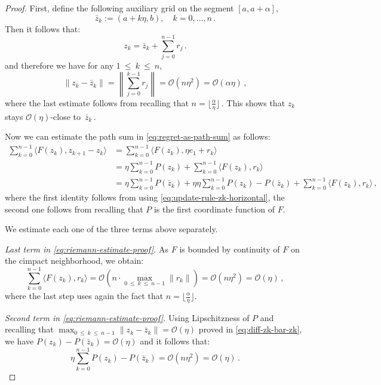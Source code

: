 \documentclass[a4paper,11pt,fullpage]{article}
\theoremstyle{plain}
\theoremstyle{definition}
\theoremstyle{plain}
\renewcommand{\leq}{~\le~}
\begin{document}
\begin{proof}
First, define the following auxiliary grid on the segment $[a, a+\alpha]$, 
\begin{equation*}
\bar{z}_k := (a + k \eta, b), \quad k= 0, \dots, n\,.
\end{equation*}
Then it follows that: 
\begin{equation*}
z_k = \bar{z}_k + \sum_{j=0}^{n-1} r_j\,.
\end{equation*}
and therefore we have for any $1 \leq k \leq n$, 
\begin{equation}
\label{eq:diff-zk-bar-zk}
\|z_k - \bar{z}_k \| = \left\| \sum_{j=0}^{k-1} r_j \right\| = \mathcal{O}(n \eta^2) = \mathcal{O}(\alpha \eta)\,,  
\end{equation}
where the last estimate follows from recalling that $n = \lfloor \frac{\alpha}{\eta}\rfloor\,.$ 
This shows that $z_k$ stays $\mathcal{O}(\eta)$-close to~$\bar{z}_k\,.$ 

Now we can estimate the path sum in \eqref{eq:regret-as-path-sum} as follows: 
\begin{align}
\label{eq:riemann-estimate-proof}
\sum_{k=0}^{n-1} \langle F(z_k), z_{k+1} - z_k \rangle 
&= \sum_{k=0}^{n-1} \langle F(z_k), \eta e_1 + r_k \rangle \nonumber\\
&= \eta \sum_{k=0}^{n-1} P(z_k) + \sum_{k=0}^{n-1} \langle F(z_k), r_k\rangle \nonumber\\
&= \eta \sum_{k=0}^{n-1} P(\bar{z}_k) + \eta \eta \sum_{k=0}^{n-1} P(z_k) - P(\bar{z}_k) + \sum_{k=0}^{n-1} \langle F(z_k), r_k\rangle\,,
\end{align}
where the first identity follows from using \eqref{eq:update-rule-zk-horizontal}, the second one follows from recalling that $P$ is the first coordinate function of $F$. 

We estimate each one of the three terms above separately. 

\noindent\textit{Last term in \eqref{eq:riemann-estimate-proof}.} As $F$ is bounded by continuity of $F$ on the cimpact neighborhood, we obtain: 
\begin{equation}
\label{eq:term3}
\sum_{k=0}^{n-1} \langle F(z_k), r_k \rangle = \mathcal{O}\left(n \cdot \max_{0 \leq k \leq n-1} \|r_k\|\right) = \mathcal{O}(n \eta^2) = \mathcal{O}(\eta)\,,
\end{equation}
where the last step uses again the fact that $n = \lfloor \frac{\alpha}{\eta}\rfloor.$ 

\noindent\textit{Second term in \eqref{eq:riemann-estimate-proof}.} Using Lipschitzness of $P$ and recalling that $\max_{0 \leq k \leq n-1} \|z_k - \bar{z}_k\| = \mathcal{O}(\eta)$ proved in \eqref{eq:diff-zk-bar-zk}, we have $P(z_k) - P(\bar{z}_k) = \mathcal{O}(\eta)$ and it follows that: 
\begin{equation}
\label{eq:term2}
\eta \sum_{k=0}^{n-1} P(z_k) - P(\bar{z}_k) = \mathcal{O}(n \eta^2) = \mathcal{O}(\eta)\,.
\end{equation}


\end{proof}
\end{document}
